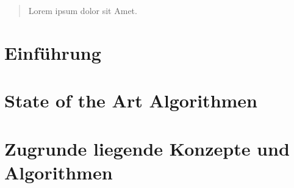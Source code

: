 \documentclass[pdftex,12pt,a4paper]{report}
\begin{document}

\deckblatt


\erklaerung


\begin{abstract}

Lorem ipsum dolor sit Amet.

\end{abstract}



\tableofcontents


\chapter{Einführung}
\label{chp:introduction}



%


\chapter{State of the Art Algorithmen}
\label{chp:stateoftheart}



\chapter{Zugrunde liegende Konzepte und Algorithmen}
\label{chp:concepts}

\end{document}
